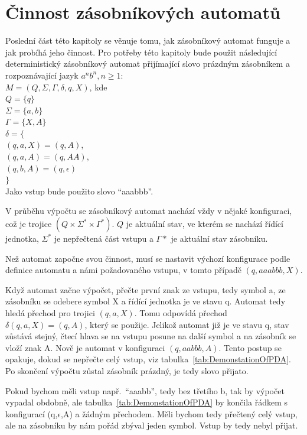 \section{Činnost zásobníkových automatů}

Poslední část této kapitoly se věnuje tomu, jak zásobníkový automat funguje a jak probíhá jeho činnost. Pro potřeby této kapitoly bude použit následující deterministický zásobníkový automat přijímající slovo prázdným zásobníkem a rozpoznávající jazyk $a^{n}b^{n}, n \ge 1$:\\
$M = (Q, \Sigma, \Gamma, \delta, q, X)$, kde \\
\indent$Q = \{q\}$\\
\indent$\Sigma = \{a,b\}$\\
\indent$\Gamma = \{X,A\}$\\
\indent$\delta = \{$\\
\indent\indent$(q,a,X) = (q,A)$,\\
\indent\indent$(q,a,A) = (q,AA)$,\\
\indent\indent$(q,b,A) = (q,\epsilon)$\\
\indent$\}$\\
Jako vstup bude použito slovo ``aaabbb''.

V průběhu výpočtu se zásobníkový automat nachází vždy v nějaké konfiguraci, což je trojice $(Q \times \Sigma^{*} \times \Gamma^{*})$. $Q$ je aktuální stav, ve kterém se nachází řídící jednotka, $\Sigma^{*}$ je nepřečtená část vstupu a $\Gamma{*}$ je aktuální stav zásobníku. 

Než automat započne svou činnost, musí se nastavit výchozí konfigurace podle definice automatu a námi požadovaného vstupu, v tomto případě $(q,aaabbb,X)$. 

Když automat začne výpočet, přečte první znak ze vstupu, tedy symbol a, ze zásobníku se odebere symbol X a řídící jednotka je ve stavu q. Automat tedy hledá přechod pro trojici $(q,a,X)$. Tomu odpovídá přechod $\delta(q,a,X) = (q,A)$, který se použije. Jelikož automat již je ve stavu q, stav zůstává stejný, čtecí hlava se na vstupu posune na další symbol a na zásobník se vloží znak A. Nově je automat v konfiguraci $(q,aabbb,A)$. Tento postup se opakuje, dokud se nepřečte celý vstup, viz tabulka~\ref{tab:DemonstationOfPDA}. Po skončení výpočtu zůstal zásobník prázdný, je tedy slovo přijato. 

Pokud bychom měli vstup např.\ ``aaabb'', tedy bez třetího b, tak by výpočet vypadal obdobně, ale tabulka~\ref{tab:DemonstationOfPDA} by končila řádkem s konfigurací (q,$\epsilon$,A) a žádným přechodem. Měli bychom tedy přečtený celý vstup, ale na zásobníku by nám pořád zbýval jeden symbol. Vstup by tedy nebyl přijat.

